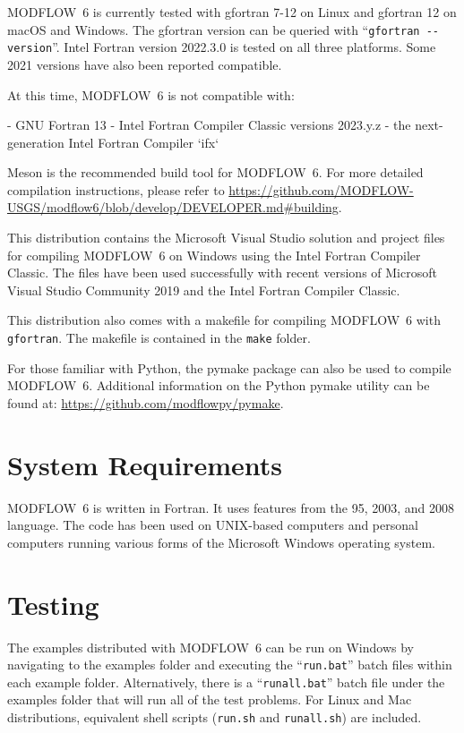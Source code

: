 \documentclass[11pt,twoside,twocolumn]{usgsreport}
\begin{document}
MODFLOW~6 is currently tested with gfortran 7-12 on Linux and gfortran 12 on macOS and Windows. The gfortran version can be queried with ``\verb|gfortran --version|''.  Intel Fortran version 2022.3.0 is tested on all three platforms. Some 2021 versions have also been reported compatible.

At this time, MODFLOW~6 is not compatible with:

- GNU Fortran 13
- Intel Fortran Compiler Classic versions 2023.y.z
- the next-generation Intel Fortran Compiler `ifx`

Meson is the recommended build tool for MODFLOW~6.  For more detailed compilation instructions, please refer to \url{https://github.com/MODFLOW-USGS/modflow6/blob/develop/DEVELOPER.md#building}.

This distribution contains the Microsoft Visual Studio solution and project files for compiling MODFLOW~6 on Windows using the Intel Fortran Compiler Classic.  The files have been used successfully with recent versions of Microsoft Visual Studio Community 2019 and the Intel Fortran Compiler Classic.

This distribution also comes with a makefile for compiling MODFLOW~6 with \texttt{gfortran}.  The makefile is contained in the \texttt{make} folder.

For those familiar with Python, the pymake package can also be used to compile MODFLOW~6.  Additional information on the Python pymake utility can be found at: \url{https://github.com/modflowpy/pymake}.

\section{System Requirements}
MODFLOW~6 is written in Fortran.  It uses features from the 95, 2003, and 2008 language.  The code has been used on UNIX-based computers and personal computers running various forms of the Microsoft Windows operating system.

\section{Testing}
The examples distributed with MODFLOW~6 can be run on Windows by navigating to the examples folder and executing the ``\texttt{run.bat}'' batch files within each example folder.  Alternatively, there is a ``\texttt{runall.bat}'' batch file under the examples folder that will run all of the test problems.  For Linux and Mac distributions, equivalent shell scripts (\texttt{run.sh} and \texttt{runall.sh}) are included.
\end{document}
